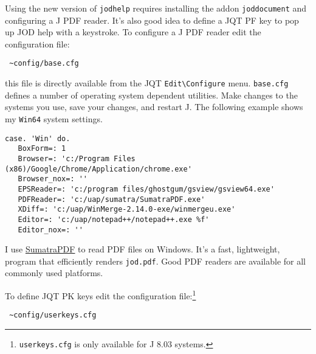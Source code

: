 Using the new version of \texttt{jodhelp} requires installing the addon
\texttt{joddocument} and configuring a J PDF reader. It's also good idea
to define a JQT PF key to pop up JOD help with a keystroke. To configure
a J PDF reader edit the configuration file:

\begin{tcolorbox}[breakable, size=fbox, boxrule=1pt, pad at break*=1mm,colback=cellbackground, colframe=cellborder]
\begin{verbatim}
 ~config/base.cfg
\end{verbatim}
\end{tcolorbox}

\noindent this file is directly available from the JQT
\texttt{Edit\textbackslash{}Configure} menu. \texttt{base.cfg} defines a
number of operating system dependent utilities. Make changes to the
systems you use, save your changes, and restart J. The following example
shows my \texttt{Win64} system settings.

\begin{tcolorbox}[breakable, size=fbox, boxrule=1pt, pad at break*=1mm,colback=cellbackground, colframe=cellborder]
\begin{lstlisting}[language=jdoc, frame=single,framerule=0pt,label=lst:scr4946X0]
 case. 'Win' do.   
   BoxForm=: 1   
   Browser=: 'c:/Program Files (x86)/Google/Chrome/Application/chrome.exe'   
   Browser_nox=: ''   
   EPSReader=: 'c:/program files/ghostgum/gsview/gsview64.exe'   
   PDFReader=: 'c:/uap/sumatra/SumatraPDF.exe'   
   XDiff=: 'c:/uap/WinMerge-2.14.0-exe/winmergeu.exe'   
   Editor=: 'c:/uap/notepad++/notepad++.exe %f'   
   Editor_nox=: '' 
\end{lstlisting}
\end{tcolorbox}

I use
\href{http://www.sumatrapdfreader.org/free-pdf-reader.html}{SumatraPDF}
to read PDF files on Windows. It's a fast, lightweight, program that
efficiently renders \texttt{jod.pdf}. Good PDF readers are available for
all commonly used platforms.

To define JQT PK keys edit the configuration
file:\footnote{\texttt{userkeys.cfg} is only available for J 8.03 systems.
}

\begin{tcolorbox}[breakable, size=fbox, boxrule=1pt, pad at break*=1mm,colback=cellbackground, colframe=cellborder]
\begin{verbatim}
 ~config/userkeys.cfg 
\end{verbatim}
\end{tcolorbox}

